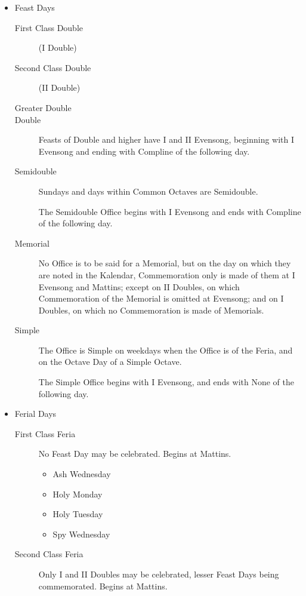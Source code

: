 \begin{itemize}
    \item Feast Days
        \begin{description}
            \item[First Class Double] (I Double)
            \item[Second Class Double] (II Double)
            \item[Greater Double]
            \item[Double] Feasts of Double and higher have I and II Evensong, beginning with I Evensong and ending with Compline of the following day.
            \item[Semidouble] Sundays and days within Common Octaves are Semidouble.\par
            The Semidouble Office begins with I Evensong and ends with Compline of the following day.
            \item[Memorial] No Office is to be said for a Memorial, but on the day on which they are noted in the Kalendar, Commemoration only is made of them at I Evensong and Mattins; except on II Doubles, on which Commemoration of the Memorial is omitted at Evensong; and on I Doubles, on which no Commemoration is made of Memorials.
            \item[Simple] The Office is Simple on weekdays when the Office is of the Feria, and on the Octave Day of a Simple Octave.\par
                The Simple Office begins with I Evensong, and ends with None of the following day.
        \end{description}
    \item Ferial Days
        \begin{description}
            \item[First Class Feria] No Feast Day may be celebrated. Begins at Mattins.
                \begin{itemize}
                    \item Ash Wednesday
                    \item Holy Monday
                    \item Holy Tuesday
                    \item Spy Wednesday
                \end{itemize}
            \item[Second Class Feria] Only I and II Doubles may be celebrated, lesser Feast Days being commemorated. Begins at Mattins.

\end{description}
\end{itemize}
